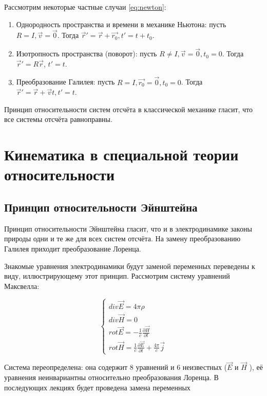 \documentclass{article}
\begin{document}
Рассмотрим некоторые частные случаи \eqref{eq:newton}:
\begin{enumerate}
    \item Однородность пространства и времени в механике Ньютона: пусть $R=I, \vec{v}=\vec{0}$. Тогда $\vec{r}'=\vec{r}+\vec{r_0}, t'=t+t_0$.
    \item Изотропность пространства (поворот): пусть $R\neq{I}, \vec{v}=\vec{0}, t_0=0$. Тогда $\vec{r}'=R\vec{r}$, $t'=t$.
    \item Преобразование Галилея: пусть $R=I, \vec{r_0}=\vec{0}, t_0=0$. Тогда $\vec{r}'=\vec{r}+\vec{v}t, t'=t$.
\end{enumerate}

Принцип относительности систем отсчёта в классической механике гласит, что все системы отсчёта равноправны.

\section{Кинематика в специальной теории относительности}

\subsection{Принцип относительности Эйнштейна}

Принцип относительности Эйнштейна гласит, что и в электродинамике законы природы одни и те же для всех систем отсчёта. На замену преобразованию Галилея приходит преобразование Лоренца.

Знакомые уравнения электродинамики будут заменой переменных переведены к виду, иллюстрирующему этот принцип. Рассмотрим систему уравнений Максвелла:

\begin{equation}\label{eq:maxwell}
    \begin{cases}
    div\vec{E}=4\pi\rho\\
    div\vec{H}=0\\
    rot\vec{E}=-\frac{1}{c}\frac{\partial\vec{H}}{\partial t}\\
    rot\vec{H}=\frac{1}{c}\frac{\partial\vec{E}}{\partial t}+\frac{4\pi}{c}\vec{j}
    \end{cases}
\end{equation}

Система переопределена: она содержит 8 уравнений и 6 неизвестных ($\vec{E}$ и $\vec{H}$
), её уравнения неинвариантны относительно преобразования Лоренца. В последующих лекциях будет проведена замена переменных
\end{document}
